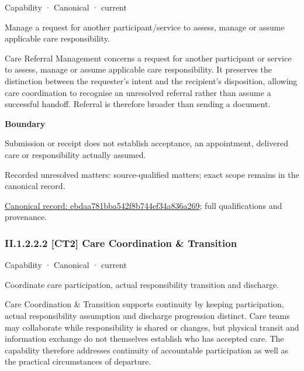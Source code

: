 \label{element:ebdaa781bba542f8b744ef34a836a269}
{\small Capability · Canonical · current}\par

Manage a request for another participant/service to assess, manage or assume applicable care responsibility.



Care Referral Management concerns a request for another participant or service to assess, manage or assume applicable care responsibility. It preserves the distinction between the requester's intent and the recipient's disposition, allowing care coordination to recognise an unresolved referral rather than assume a successful handoff. Referral is therefore broader than sending a document.



\textbf{Boundary}



Submission or receipt does not establish acceptance, an appointment, delivered care or responsibility actually assumed.


{\small Recorded unresolved matters: source-qualified matters; exact scope remains in the canonical record.}\par
{\footnotesize \href{../../../../continuum/strategy/capability/ebdaa781bba542f8b744ef34a836a269.md}{Canonical record: ebdaa781bba542f8b744ef34a836a269}; full qualifications and provenance.}\par
\subsubsection*{II.1.2.2.2 [CT2] Care Coordination \& Transition}
\label{navigation:II.1.2.2.2}

\label{element:174a9b93d19c44828f20360e9d543925}
{\small Capability · Canonical · current}\par

Coordinate care participation, actual responsibility transition and discharge.



Care Coordination \& Transition supports continuity by keeping participation, actual responsibility assumption and discharge progression distinct. Care teams may collaborate while responsibility is shared or changes, but physical transit and information exchange do not themselves establish who has accepted care. The capability therefore addresses continuity of accountable participation as well as the practical circumstances of departure.



